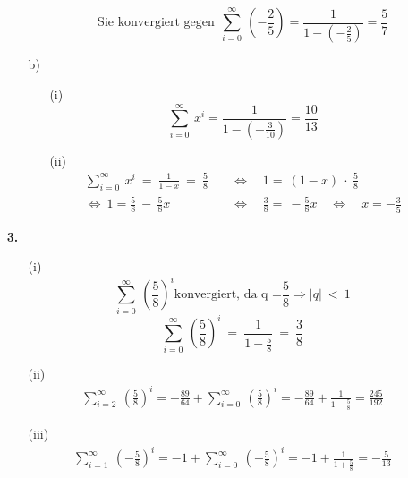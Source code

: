 \documentclass [a4paper,12pt]{article}
\begin{document}
\begin{enumerate}
\begin{enumerate}
\begin{enumerate}
            				\[\text{Sie konvergiert gegen} \ \  \sum_{i=0}^\infty~\left(-\frac{2}{5}\right) = \frac{1}{1-(-\frac{2}{5})} = \frac{5}{7} \]
                    \end{enumerate}
                \item[b)]
                    \begin{enumerate}
        			    \item[(i)]
                            \[ \sum_{i=0}^\infty~x^i = \frac{1}{1-(-\frac{3}{10})} = \frac{10}{13} \]
        			    \item[(ii)]
        			    	\begin{align*}
        						 \sum_{i=0}^\infty~x^i \ = \ \frac{1}{1-x} \ = \ \frac{5}{8} \quad &\Leftrightarrow \quad 1  = \ (1-x) \ \cdot \ \frac{5}{8} \\[0,5cm]
        						 \Leftrightarrow   \  1  = \frac{5}{8} \ - \ \frac{5}{8}x \quad &\Leftrightarrow \quad \frac{3}{8}  = \ -\frac{5}{8}x \quad \Leftrightarrow \quad x = -\frac{3}{5}
        					\end {align*}	
                    \end{enumerate}
            \end{enumerate}
        \item[\textbf{3.}]
            \begin{enumerate}
        		\item[(i)]
        			$$\sum_{i=0}^\infty~\left(\frac{5}{8} \right)^i \text{konvergiert, da q =} \frac{5}{8} \Rightarrow |q| \ < \ 1$$ 
        			$$\sum_{i=0}^\infty~\left(\frac{5}{8} \right)^i \ = \ \frac{1}{1 -\frac{5}{8}} \ = \ \frac{3}{8} $$
        		\item[(ii)]
                    \begin{align*}
                        \sum_{i=2}^\infty~\left(\frac{5}{8} \right)^i
                        = - \frac{89}{64}+\sum_{i=0}^\infty~\left(\frac{5}{8} \right)^i
                        = - \frac{89}{64}+\frac{1}{1 -\frac{5}{8}}
                        = \frac{245}{192}
                    \end{align*}
        		\item[(iii)]
                    \begin{align*}
                        \sum_{i=1}^\infty~\left(-\frac{5}{8} \right)^i
                        = -1+\sum_{i=0}^\infty~\left(-\frac{5}{8} \right)^i
                        = -1+\frac{1}{1+\frac{5}{8}}
                        = -\frac{5}{13}
                    \end{align*}

\end{enumerate}
\end{enumerate}
\end{document}
